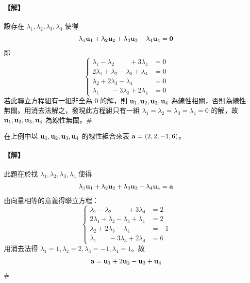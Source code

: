 \paragraph{【解】}
設存在 $\lambda_1, \lambda_2, \lambda_3, \lambda_4$ 使得
\[ \uplambda_1\boldsymbol{\mathbf{u}}_1 + \uplambda_2\boldsymbol{\mathbf{u}}_2 + \uplambda_3\boldsymbol{\mathbf{u}}_3 + \uplambda_4\boldsymbol{\mathbf{u}}_4 = \boldsymbol{\mathbf{0}} \]
即
\begin{equation}
\left\{\begin{aligned}
\lambda_1 - \lambda_2 \phantom{+ 2\lambda_3} + 3\lambda_4 &= 0 \\
2\lambda_1 + \lambda_2 - \lambda_3 + \lambda_4 &= 0 \\
\lambda_2 + 2\lambda_3 - \lambda_4 &= 0 \\
\lambda_1 \phantom{+ \lambda_2} - 3\lambda_3 + 2\lambda_4 &= 0
\end{aligned}\right. \label{eq:b6s-1-1-9}
\end{equation}
若此聯立方程組有一組非全為 0 的解，則 $\boldsymbol{\mathbf{u}}_1, \boldsymbol{\mathbf{u}}_2, \boldsymbol{\mathbf{u}}_3, \boldsymbol{\mathbf{u}}_4$ 為線性相關，否則為線性無關。用消去法解之，發現此方程組只有一組 $\lambda_1=\lambda_2=\lambda_3=\lambda_4=0$ 的解，故 $\boldsymbol{\mathbf{u}}_1, \boldsymbol{\mathbf{u}}_2, \boldsymbol{\mathbf{u}}_3, \boldsymbol{\mathbf{u}}_4$ 為線性無關。\hfill$\#$

\begin{example}\label{ex:b6s-1-6}
在上例中以 $\boldsymbol{\mathbf{u}}_1, \boldsymbol{\mathbf{u}}_2, \boldsymbol{\mathbf{u}}_3, \boldsymbol{\mathbf{u}}_4$ 的線性組合來表 $\boldsymbol{\mathbf{a}}=(2, 2, -1, 6)$。
\end{example}

\paragraph{【解】}
此題在於找 $\lambda_1, \lambda_2, \lambda_3, \lambda_4$ 使得
\[ \uplambda_1\boldsymbol{\mathbf{u}}_1 + \uplambda_2\boldsymbol{\mathbf{u}}_2 + \uplambda_3\boldsymbol{\mathbf{u}}_3 + \uplambda_4\boldsymbol{\mathbf{u}}_4 = \boldsymbol{\mathbf{a}} \]
由向量相等的意義得聯立方程：
\begin{equation}
\left\{\begin{aligned}
\lambda_1 - \lambda_2 \phantom{+ 2\lambda_3} + 3\lambda_4 &= 2 \\
2\lambda_1 + \lambda_2 - \lambda_3 + \lambda_4 &= 2 \\
\lambda_2 + 2\lambda_3 - \lambda_4 &= -1 \\
\lambda_1 \phantom{+ \lambda_2} - 3\lambda_3 + 2\lambda_4 &= 6
\end{aligned}\right. \label{eq:b6s-1-1-10}
\end{equation}
用消去法得 $\lambda_1=1, \lambda_2=2, \lambda_3=-1, \lambda_4=1$。故
\[ \boldsymbol{\mathbf{a}} = \boldsymbol{\mathbf{u}}_1 + 2\boldsymbol{\mathbf{u}}_2 - \boldsymbol{\mathbf{u}}_3 + \boldsymbol{\mathbf{u}}_4 \]\hfill$\#$

